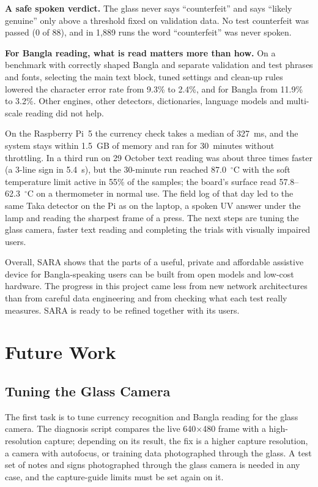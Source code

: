 \textbf{A safe spoken verdict.} The glass never says ``counterfeit'' and says ``likely genuine'' only above a threshold fixed on validation data. No test counterfeit was passed (0 of 88), and in 1,889 runs the word ``counterfeit'' was never spoken.

\textbf{For Bangla reading, what is read matters more than how.} On a benchmark with correctly shaped Bangla and separate validation and test phrases and fonts, selecting the main text block, tuned settings and clean-up rules lowered the character error rate from 9.3\% to 2.4\%, and for Bangla from 11.9\% to 3.2\%. Other engines, other detectors, dictionaries, language models and multi-scale reading did not help.

On the Raspberry Pi~5 the currency check takes a median of 327~ms, and the system stays within 1.5~GB of memory and ran for 30~minutes without throttling. In a third run on 29 October text reading was about three times faster (a 3-line sign in 5.4~s), but the 30-minute run reached 87.0~$^\circ$C with the soft temperature limit active in 55\% of the samples; the board's surface read 57.8--62.3~$^\circ$C on a thermometer in normal use. The field log of that day led to the same Taka detector on the Pi as on the laptop, a spoken UV answer under the lamp and reading the sharpest frame of a press. The next steps are tuning the glass camera, faster text reading and completing the trials with visually impaired users.

Overall, SARA shows that the parts of a useful, private and affordable assistive device for Bangla-speaking users can be built from open models and low-cost hardware. The progress in this project came less from new network architectures than from careful data engineering and from checking what each test really measures. SARA is ready to be refined together with its users.

\section{Future Work}

\subsection{Tuning the Glass Camera}
The first task is to tune currency recognition and Bangla reading for the glass camera. The diagnosis script compares the live 640$\times$480 frame with a high-resolution capture; depending on its result, the fix is a higher capture resolution, a camera with autofocus, or training data photographed through the glass. A test set of notes and signs photographed through the glass camera is needed in any case, and the capture-guide limits must be set again on it.


